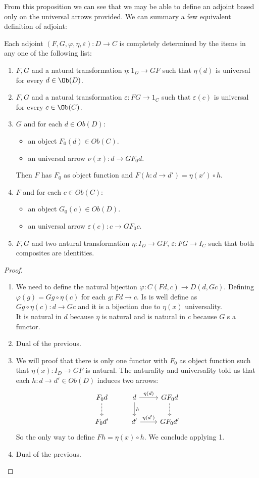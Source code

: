 From this proposition we can see that we may be able to define an adjoint based only on the universal arrows provided. We can summary a few equivalent definition of adjoint:
\begin{proposition}\label{prop:equivdefinition}
  Each adjoint $(F,G,\varphi,\eta,\varepsilon):D\to C$ is completely determined by the items in any one of the following list:
  \begin{enumerate}
  \item $F,G$ and a natural transformation $\eta:1_D\to GF$ such that $\eta(d)$ is universal for every $d\in \Ob(D)$.
  \item $F,G$ and a natural transformation $\varepsilon:FG\to 1_C$ such that $\varepsilon(c)$ is universal for every $c\in \Ob(C)$.
  \item $G$ and for each $d\in Ob(D)$:
    \begin{itemize}
    \item an object $F_0(d)\in Ob(C)$.
    \item an universal arrow $\nu(x):d \to GF_0 d$.
    \end{itemize}
    Then $F$ has $F_0$ as object function and $F(h:d\to d') = \eta(x')\circ h$.
  \item $F$ and for each $c\in Ob(C)$:
    \begin{itemize}
    \item an object $G_0(c)\in Ob(D)$.
    \item an universal arrow $\varepsilon(c):c \to GF_0 c$.
    \end{itemize}
  \item  $F,G$ and two natural transformation $\eta: I_D\to GF$, $\varepsilon: FG\to I_C$ such that both composites are identities.
  \end{enumerate}
\end{proposition}
\begin{proof}
  \begin{enumerate}
    
  \item We need to define the natural bijection $\varphi: C(Fd,c)\to D(d,Gc)$. Defining  $\varphi(g) = Gg\circ \eta(c)$ for each $g:Fd \to c$. Is is well define as $Gg\circ \eta(c): d\to Gc$ and it is a bijection  due to $\eta(x)$ universality.\\

    It is natural in $d$ because $\eta$ is natural and is natural in $c$ because $G$ s a functor.
  \item Dual of the previous.
  \item We will proof that there is only one functor with $F_0$ as object function such that $\eta (x): I_D\to GF$ is natural. The naturality and universality told us that each $h:d\to d'\in Ob(D)$ induces two arrows:
\[
\begin{tikzcd}
  F_0 d\arrow[dashed]{d} & d\arrow{d}{h}\arrow{r}{\eta (d)}&GF_0d\arrow[dashed]{d}\\
  F_0 d'& d'\arrow{r}{\eta (d')} & GF_0d'
\end{tikzcd}
\]
    So the only way to define $Fh= \eta (x) \circ h$. We conclude applying 1.
  \item Dual of the previous.
  \end{enumerate}
\end{proof}
